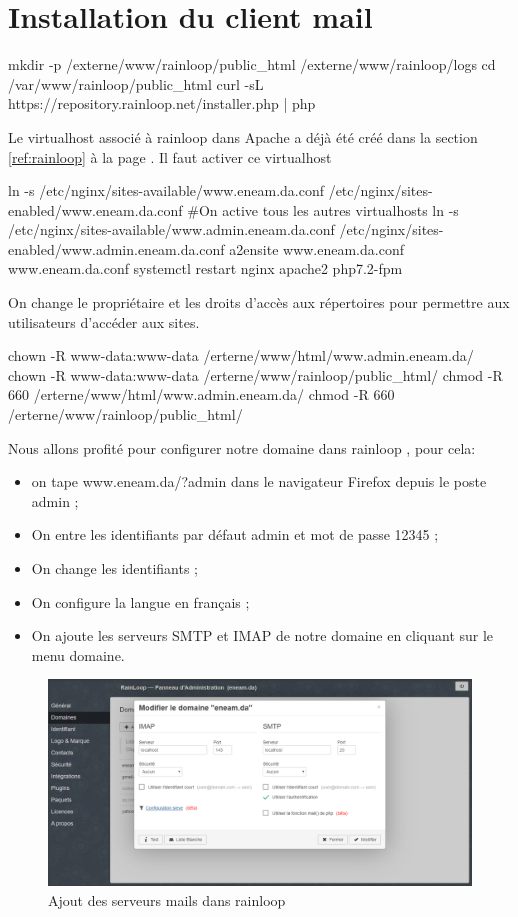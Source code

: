 \documentclass[a4paper,12pt,french]{report} %
\begin{document}
\section{Installation du client mail}
\begin{exempleConsole}
mkdir -p /externe/www/rainloop/public_html /externe/www/rainloop/logs 
cd /var/www/rainloop/public_html 
curl -sL https://repository.rainloop.net/installer.php | php
\end{exempleConsole}
Le virtualhost associé à rainloop dans Apache a déjà été créé dans la section \ref{ref:rainloop} à la page \pageref{ref:rainloop}. 
Il faut activer ce virtualhost
\begin{exempleConsole}
ln -s /etc/nginx/sites-available/www.eneam.da.conf /etc/nginx/sites-enabled/www.eneam.da.conf
#On active tous les autres virtualhosts
ln -s /etc/nginx/sites-available/www.admin.eneam.da.conf /etc/nginx/sites-enabled/www.admin.eneam.da.conf
a2ensite www.eneam.da.conf www.eneam.da.conf
systemctl restart nginx apache2 php7.2-fpm 
\end{exempleConsole}
On change le propriétaire et les droits d'accès aux répertoires pour permettre aux utilisateurs d'accéder aux sites.
\begin{exempleConsole}
chown -R www-data:www-data /erterne/www/html/www.admin.eneam.da/ 
chown -R www-data:www-data /erterne/www/rainloop/public_html/
chmod -R 660  /erterne/www/html/www.admin.eneam.da/  
chmod -R 660 /erterne/www/rainloop/public_html/
\end{exempleConsole}
Nous allons profité pour configurer notre domaine dans rainloop , pour cela:
\begin{itemize}
	\item on tape www.eneam.da/?admin dans le navigateur Firefox depuis le poste admin ;
	\item On entre les identifiants par défaut admin et mot de passe 12345 ;
	\item On change les identifiants ;
	\item On configure la langue en français ;
	\item On ajoute les serveurs SMTP et IMAP de notre domaine en cliquant sur le menu domaine.
\end{itemize} 
\begin{figure}[H]
	\centering
	\includegraphics[width=483pt]{figure/configuration-domaine-rainloop.png}
	\caption{Ajout des serveurs mails dans rainloop}
\end{figure}
\end{document}
